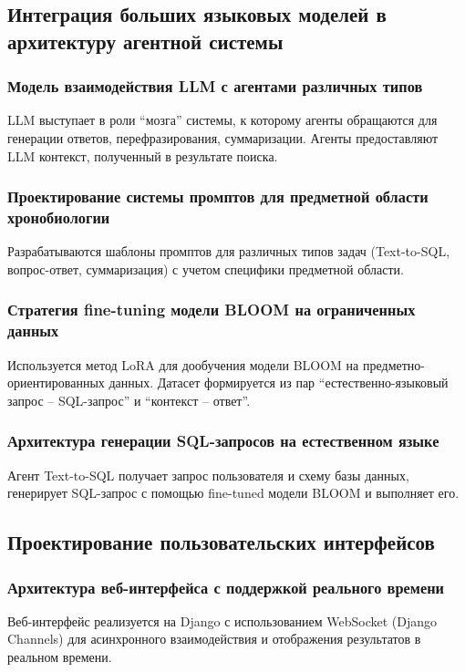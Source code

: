 \documentclass[a4paper,14pt]{extarticle}
\begin{document}
	\subsection{Интеграция больших языковых моделей в архитектуру агентной системы}
	
	\subsubsection{Модель взаимодействия LLM с агентами различных типов}
	LLM выступает в роли ``мозга'' системы, к которому агенты обращаются для генерации ответов, перефразирования, суммаризации. Агенты предоставляют LLM контекст, полученный в результате поиска.
	
	\subsubsection{Проектирование системы промптов для предметной области хронобиологии}
	Разрабатываются шаблоны промптов для различных типов задач (Text-to-SQL, вопрос-ответ, суммаризация) с учетом специфики предметной области.
	
	\subsubsection{Стратегия fine-tuning модели BLOOM на ограниченных данных}
	Используется метод LoRA для дообучения модели BLOOM на предметно-ориентированных данных. Датасет формируется из пар ``естественно-языковый запрос – SQL-запрос'' и ``контекст – ответ''.
	
	\subsubsection{Архитектура генерации SQL-запросов на естественном языке}
	Агент Text-to-SQL получает запрос пользователя и схему базы данных, генерирует SQL-запрос с помощью fine-tuned модели BLOOM и выполняет его.
	
	\subsection{Проектирование пользовательских интерфейсов}
	
	\subsubsection{Архитектура веб-интерфейса с поддержкой реального времени}
	Веб-интерфейс реализуется на Django с использованием WebSocket (Django Channels) для асинхронного взаимодействия и отображения результатов в реальном времени.
	
\end{document}
